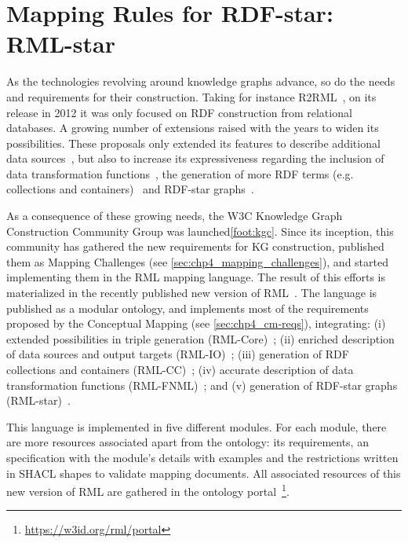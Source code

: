 \section{Mapping Rules for RDF-star: RML-star }
\label{sec:chp4_rml_star}

As the technologies revolving around knowledge graphs advance, so do the needs and requirements for their construction. Taking for instance R2RML~\cite{das2012r2rml}, on its release in 2012 it was only focused on RDF construction from relational databases. A growing number of extensions raised with the years to widen its possibilities. These proposals only extended its features to describe additional data sources~\citep{DBLP:conf/webist/MichelDFM15,VanAssche2021LeveragingWebThings}, but also to increase its expressiveness regarding the inclusion of data transformation functions~\citep{de2020implementation,debruyne2016r2rmlf,junior2016funul,kyzirakos2018geotriples}, the generation of more RDF terms (e.g. collections and containers)~\cite{DBLP:conf/webist/MichelDFM15,DBLP:conf/ercimdl/DebruyneMO17} and RDF-star graphs~\citep{delva2021rml-star,sundqvist2022extending}. 

As a consequence of these growing needs, the W3C Knowledge Graph Construction Community Group was launched\cref{foot:kgc}. Since its inception, this community has gathered the new requirements for KG construction, published them as Mapping Challenges (see \cref{sec:chp4_mapping_challenges}), and started implementing them in the RML mapping language. The result of this efforts is materialized in the recently published new version of RML~\citep{iglesias2023rml}. The language is published as a modular ontology, and implements most of the requirements proposed by the Conceptual Mapping (see \cref{sec:chp4_cm-reqs}), integrating: (i) extended possibilities in triple generation (RML-Core)~\citep{core_ontology}; (ii) enriched description of data sources and output targets (RML-IO)~\citep{io_ontology}; (iii) generation of RDF collections and containers (RML-CC)~\citep{cc_ontology}; (iv) accurate description of data transformation functions (RML-FNML)~\citep{fnml_ontology}; and (v) generation of RDF-star graphs (RML-star)~\citep{star_ontology}.

This language is implemented in five different modules. For each module, there are more resources associated apart from the ontology: its requirements, an specification with the module's details with examples and the restrictions written in SHACL shapes to validate mapping documents. All associated resources of this new version of RML are gathered in the ontology portal~\footnote{\url{https://w3id.org/rml/portal}}.

